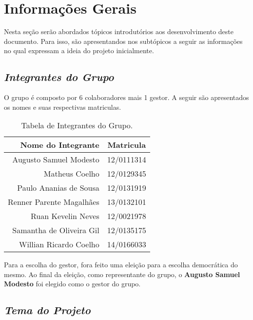 \chapter[Informações Gerais]{Informações Gerais}
\label{chap:informacoesGerais}
	
	Nesta seção serão abordados tópicos introdutórios aos desenvolvimento deste documento. Para isso, são apresentandos nos subtópicos a seguir as informações no qual expressam a ideia do projeto inicialmente.

	\section[Integrantes do Grupo]{\emph{Integrantes do Grupo}}
	\label{sec:informacoesGerais_integrantes}

		O grupo é composto por 6 colaboradores mais 1 gestor. A seguir são apresentados os nomes e suas respectivas matriculas.

		\label{subsubsec:informacoesGerais_integrantes_tables}
		\begin{table}[h]
			\centering 
			\begin{tabular}{r|c}

				Nome do Integrante & Matricula \\
				
				\hline

				Augusto Samuel Modesto & 12/0111314 \\
				Matheus Coelho & 12/0129345 \\
				Paulo Ananias de Sousa & 12/0131919 \\
				Renner Parente Magalhães & 13/0132101 \\
				Ruan Kevelin Neves & 12/0021978 \\
				Samantha de Oliveira Gil & 12/0135175 \\
				Willian Ricardo Coelho & 14/0166033 \\

			\end{tabular}
			\caption[Tabela de Integrantes do Grupo]{Tabela de Integrantes do Grupo.}
			\label{tab:informacoesGerais_integrantes_.tables}
		\end{table}

		Para a escolha do gestor, fora feito uma eleição para a escolha democrática do mesmo. Ao final da eleição, como representante do grupo, o \textbf{Augusto Samuel Modesto} foi elegido como o gestor do grupo.

	\section[Tema do Projeto]{\emph{Tema do Projeto}}
	\label{sec:informacoesGerais_tema}

